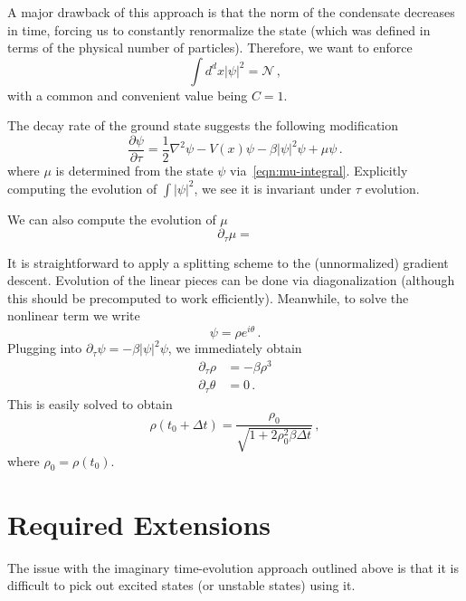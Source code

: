 \documentclass{revtex4}
\newcommand{\abs}[1]{\ensuremath{\left|#1\right|}}
\begin{document}
A major drawback of this approach is that the norm of the condensate decreases in time, forcing us to constantly renormalize the state (which was defined in terms of the physical number of particles).  Therefore, we want to enforce
\begin{equation}
  \int d^dx |\psi|^2 = \mathcal{N} \, ,
\end{equation}
with a common and convenient value being $C=1$.

The decay rate of the ground state suggests the following modification
\begin{equation}
  \frac{\partial\psi}{\partial \tau} = \frac{1}{2}\nabla^2\psi - V(x)\psi - \beta |\psi|^2\psi + \mu\psi\, .
\end{equation}
where $\mu$ is determined from the state $\psi$ via~\eqref{eqn:mu-integral}.  Explicitly computing the evolution of $\int\abs{\psi}^2$, we see it is invariant under $\tau$ evolution.

We can also compute the evolution of $\mu$
\begin{equation}
  \partial_\tau\mu = 
\end{equation}

It is straightforward to apply a splitting scheme to the (unnormalized) gradient descent.  Evolution of the linear pieces can be done via diagonalization (although this should be precomputed to work efficiently).
Meanwhile, to solve the nonlinear term we write
\begin{equation}
  \psi = \rho e^{i\theta} \, .
\end{equation}
Plugging into $\partial_\tau\psi = -\beta\abs{\psi}^2\psi$, we immediately obtain
\begin{align}
  \partial_\tau\rho &= -\beta\rho^3 \\
  \partial_\tau\theta &= 0 \, .
\end{align}
This is easily solved to obtain
\begin{equation}
  \rho(t_0+\Delta t) = \frac{\rho_0}{\sqrt{1+2\rho_0^2\beta\Delta t}} \, ,
\end{equation}
where $\rho_0 = \rho(t_0)$.

\section{Required Extensions}
The issue with the imaginary time-evolution approach outlined above is that it is difficult to pick out excited states (or unstable states) using it.
\end{document}
